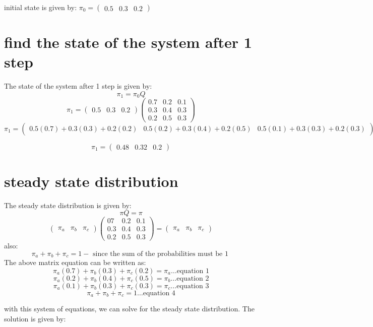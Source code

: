 \documentclass{article}
\begin{document}
initial state is given by: \(\pi_0 = \begin{pmatrix} 0.5 & 0.3 & 0.2 \end{pmatrix}\)

\section{find the state of the system after 1 step}
The state of the system after 1 step is given by:
\[\pi_1 = \pi_0Q\]
\[\pi_1 = \begin{pmatrix} 0.5 & 0.3 & 0.2 \end{pmatrix}\begin{pmatrix}0.7 & 0.2 & 0.1 \\ 0.3 & 0.4 & 0.3 \\ 0.2 & 0.5 & 0.3\end{pmatrix}\]
\[\pi_1 = \begin{pmatrix}
0.5(0.7) + 0.3(0.3) + 0.2(0.2) & 0.5(0.2) + 0.3(0.4) + 0.2(0.5) & 0.5(0.1) + 0.3(0.3) + 0.2(0.3)
\end{pmatrix}\]

\[\pi_1 = \begin{pmatrix}0.48 & 0.32 & 0.2\end{pmatrix}\]

\section{steady state distribution}
The steady state distribution is given by:
\[\pi Q= \pi\]
\[\begin{pmatrix}
\pi_a & \pi_b & \pi_c
\end{pmatrix}\begin{pmatrix}07 & 0.2 & 0.1 \\ 0.3 & 0.4 & 0.3 \\ 0.2 & 0.5 & 0.3\end{pmatrix} = \begin{pmatrix} \pi_a & \pi_b & \pi_c \end{pmatrix}\]
also:
\[\pi_a + \pi_b + \pi_c = 1 -\text{ since the sum of the probabilities must be 1 }\]
The  above matrix equation can be written as:
\[\pi_a(0.7) + \pi_b(0.3) + \pi_c(0.2) = \pi_a \ldots \text{equation 1}\]
\[\pi_a(0.2) + \pi_b(0.4) + \pi_c(0.5) = \pi_b \ldots\text{equation 2}\]
\[\pi_a(0.1) + \pi_b(0.3) + \pi_c(0.3) = \pi_c \ldots\text{equation 3}\]
\[\pi_a + \pi_b + \pi_c = 1 \ldots\text{equation 4}\]

with this system of equations, we can solve for the steady state distribution. The solution is given by:
\end{document}
